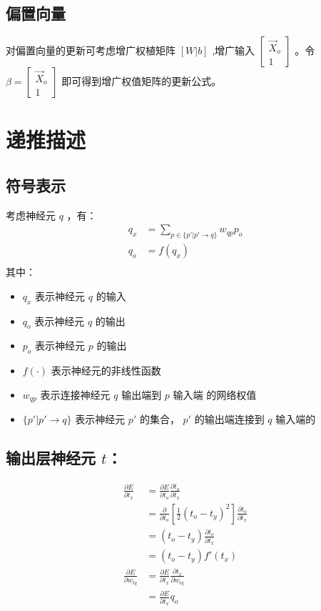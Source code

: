 \documentclass{article}
\begin{document}
\subsection{偏置向量}
对偏置向量的更新可考虑增广权植矩阵 $[W|b]$ ,增广输入 $\begin{bmatrix} \vec X_o  \\ 1\end{bmatrix}$ 。令 $\beta=\begin{bmatrix} \vec X_o \\ 1\end{bmatrix}$ 即可得到增广权值矩阵的更新公式。



\section{递推描述}

\subsection{符号表示}
考虑神经元 $q$ ，有：
\begin{align*}
q_x &= \sum_{p \in \{p'|p'\rightarrow q\}}w_{qp}p_o \\
q_o &= f(q_x) \\
\end{align*}
其中：
\begin{itemize}
	\item $q_x$ 表示神经元 $q$ 的输入
	\item $q_o$ 表示神经元 $q$ 的输出
	\item $p_o$ 表示神经元 $p$ 的输出
	\item $f(\cdot)$ 表示神经元的非线性函数
	\item $w_{qp}$ 表示连接神经元 $q$ 输出端到 $p$ 输入端 的网络权值
	\item $\{p'|p'\rightarrow q\}$ 表示神经元 $p'$ 的集合， $p'$ 的输出端连接到 $q$ 输入端的
\end{itemize}

\subsection{输出层神经元 $t$：}
\begin{align*}
\frac{\partial E}{\partial t_x} &=\frac{\partial E}{\partial t_o} \frac{\partial t_o}{\partial t_x}\\
&=\frac{\partial }{\partial t_o}[\frac{1}{2}(t_o-t_y)^2] \frac{\partial t_o}{\partial t_x}\\
&=(t_o-t_y) \frac{\partial t_o}{\partial t_x}\\
&=(t_o-t_y) f'(t_x)\\
\frac{\partial E}{\partial w_{tq}} &=\frac{\partial E}{\partial t_x}\frac{\partial t_x}{\partial w_{tq}}\\
&=\frac{\partial E}{\partial t_x}q_o
\end{align*}
\end{document}
